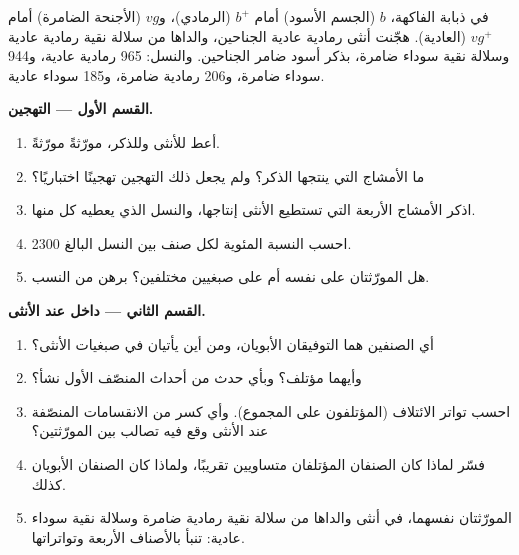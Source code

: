 \begin{problem}
\label{pb:g12:meiosis-genetic-shuffling:1}
في ذبابة الفاكهة،  $b$ (الجسم الأسود)  أمام $b^+$ (الرمادي)،
و$vg$ (الأجنحة الضامرة)  أمام $vg^+$ (العادية). هجّنت أنثى رمادية
عادية الجناحين، والداها من سلالة نقية رمادية عادية وسلالة نقية سوداء
ضامرة، بذكر أسود ضامر الجناحين. والنسل: 965 رمادية عادية، و944 سوداء
ضامرة، و206 رمادية ضامرة، و185 سوداء عادية.

\medskip
\noindent\textbf{القسم الأول --- التهجين.}
\begin{enumerate}
  \item أعط  للأنثى وللذكر، مورّثةً مورّثةً.
  \item ما الأمشاج التي ينتجها الذكر؟ ولم يجعل ذلك التهجين تهجينًا
        اختباريًا؟
  \item اذكر الأمشاج الأربعة التي تستطيع الأنثى إنتاجها، والنسل الذي
        يعطيه كل منها.
  \item احسب النسبة المئوية لكل صنف بين النسل البالغ 2300.
  \item هل المورّثتان على  نفسه أم على صبغيين مختلفين؟ برهن من
        النسب.
\end{enumerate}

\medskip
\noindent\textbf{القسم الثاني --- داخل  عند الأنثى.}
\begin{enumerate}[resume]
  \item أي الصنفين هما التوفيقان الأبويان، ومن أين يأتيان في صبغيات
        الأنثى؟
  \item وأيهما مؤتلف؟ وبأي حدث من أحداث المنصّف الأول نشأ؟
  \item احسب تواتر الائتلاف (المؤتلفون على المجموع). وأي كسر من
        الانقسامات المنصّفة عند الأنثى وقع فيه تصالب بين المورّثتين؟
  \item فسّر لماذا كان الصنفان المؤتلفان متساويين تقريبًا، ولماذا كان
        الصنفان الأبويان كذلك.
  \item المورّثتان نفسهما، في أنثى والداها من سلالة نقية رمادية ضامرة
        وسلالة نقية سوداء عادية: تنبأ بالأصناف الأربعة وتواتراتها.
\end{enumerate}


\end{problem}
